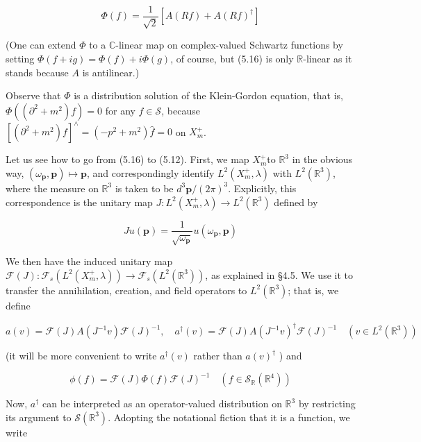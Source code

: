 \documentclass[10pt, letterpaper]{article}
\begin{document}
$$
\Phi(f)=\frac{1}{\sqrt{2}}\left[A(R f)+A(R f)^{\dagger}\right]
$$

(One can extend $\Phi$ to a $\mathbb{C}$-linear map on complex-valued Schwartz functions by setting $\Phi(f+i g)=\Phi(f)+i \Phi(g)$, of course, but (5.16) is only $\mathbb{R}$-linear as it stands because $A$ is antilinear.)

Observe that $\Phi$ is a distribution solution of the Klein-Gordon equation, that is, $\Phi\left(\left(\partial^{2}+m^{2}\right) f\right)=0$ for any $f \in \mathcal{S}$, because $\left[\left(\partial^{2}+m^{2}\right) f\right]^{\wedge}=\left(-p^{2}+m^{2}\right) \widehat{f}=0$ on $X_{m}^{+}$.

Let us see how to go from (5.16) to (5.12). First, we map $X_{m}^{+}$to $\mathbb{R}^{3}$ in the obvious way, $\left(\omega_{\mathbf{p}}, \mathbf{p}\right) \mapsto \mathbf{p}$, and correspondingly identify $L^{2}\left(X_{m}^{+}, \lambda\right)$ with $L^{2}\left(\mathbb{R}^{3}\right)$, where the measure on $\mathbb{R}^{3}$ is taken to be $d^{3} \mathbf{p} /(2 \pi)^{3}$. Explicitly, this correspondence is the unitary map $J: L^{2}\left(X_{m}^{+}, \lambda\right) \rightarrow L^{2}\left(\mathbb{R}^{3}\right)$ defined by

$$
J u(\mathbf{p})=\frac{1}{\sqrt{\omega_{\mathbf{p}}}} u\left(\omega_{\mathbf{p}}, \mathbf{p}\right)
$$

We then have the induced unitary map $\mathcal{F}(J): \mathcal{F}_{s}\left(L^{2}\left(X_{m}^{+}, \lambda\right)\right) \rightarrow \mathcal{F}_{s}\left(L^{2}\left(\mathbb{R}^{3}\right)\right)$, as explained in §4.5. We use it to transfer the annihilation, creation, and field operators to $L^{2}\left(\mathbb{R}^{3}\right)$; that is, we define

$$
a(v)=\mathcal{F}(J) A\left(J^{-1} v\right) \mathcal{F}(J)^{-1}, \quad a^{\dagger}(v)=\mathcal{F}(J) A\left(J^{-1} v\right)^{\dagger} \mathcal{F}(J)^{-1} \quad\left(v \in L^{2}\left(\mathbb{R}^{3}\right)\right)
$$

(it will be more convenient to write $a^{\dagger}(v)$ rather than $a(v)^{\dagger}$ ) and

$$
\phi(f)=\mathcal{F}(J) \Phi(f) \mathcal{F}(J)^{-1} \quad\left(f \in \mathcal{S}_{\mathbb{R}}\left(\mathbb{R}^{4}\right)\right)
$$

Now, $a^{\dagger}$ can be interpreted as an operator-valued distribution on $\mathbb{R}^{3}$ by restricting its argument to $\mathcal{S}\left(\mathbb{R}^{3}\right)$. Adopting the notational fiction that it is a function, we write
\end{document}
